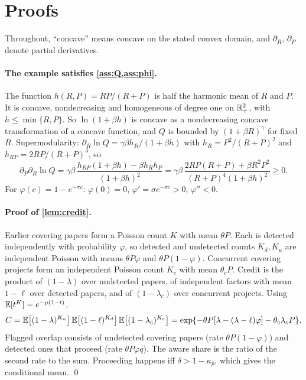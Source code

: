 \section{Proofs}\label{app:proofs}

Throughout, ``concave'' means concave on the stated convex domain, and
$\partial_R$, $\partial_P$ denote partial derivatives.

\paragraph{The example satisfies \cref{ass:Q,ass:phi}.} The function
$h(R,P)=RP/(R+P)$ is half the harmonic mean of $R$ and $P$. It is concave,
nondecreasing and homogeneous of degree one on $\mathbb{R}_+^2$, with $h\le\min\{R,P\}$.
So $\ln(1+\beta h)$ is concave as a nondecreasing concave transformation of a
concave function, and $Q$ is bounded by $(1+\beta R)^\gamma$ for fixed $R$.
Supermodularity: $\partial_R\ln Q=\gamma\beta h_R/(1+\beta h)$ with
$h_R=P^2/(R+P)^2$ and $h_{RP}=2RP/(R+P)^3$, so
\[
\partial_P\partial_R\ln Q=\gamma\beta\,\frac{h_{RP}(1+\beta h)-\beta h_Rh_P}{(1+\beta h)^2}
=\gamma\beta\,\frac{2RP(R+P)+\beta R^2P^2}{(R+P)^4(1+\beta h)^2}\ge0 .
\]
For $\varphi(c)=1-e^{-\sigma c}$: $\varphi(0)=0$, $\varphi'=\sigma e^{-\sigma c}>0$, $\varphi''<0$.

\paragraph{Proof of \cref{lem:credit}.} Earlier covering papers form a Poisson
count $K$ with mean $\theta P$. Each is detected independently with
probability $\varphi$, so detected and undetected counts $K_d,K_u$ are
independent Poisson with means $\theta P\varphi$ and $\theta P(1-\varphi)$.
Concurrent covering projects form an independent Poisson count $K_c$ with mean
$\theta_cP$. Credit is the product of $(1-\lambda)$ over undetected papers, of
independent factors with mean $1-\ell$ over detected papers, and of
$(1-\lambda_c)$ over concurrent projects. Using $\mathbb{E}[t^{K}]=e^{-\mu(1-t)}$,
\[
C=\mathbb{E}\big[(1-\lambda)^{K_u}\big]\,\mathbb{E}\big[(1-\ell)^{K_d}\big]\,\mathbb{E}\big[(1-\lambda_c)^{K_c}\big]
=\exp\{-\theta P[\lambda-(\lambda-\ell)\varphi]-\theta_c\lambda_cP\}.
\]
Flagged overlap consists of undetected covering papers (rate $\theta
P(1-\varphi)$) and detected ones that proceed (rate $\theta P\varphi q$). The
aware share is the ratio of the second rate to the sum. Proceeding happens iff
$\delta>1-\kappa_p$, which gives the conditional mean. \qed

